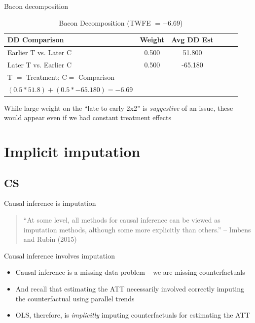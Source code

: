 \documentclass{beamer}
\begin{document}
\begin{frame}{Bacon decomposition}
\begin{table}[htbp]\centering
\small
\caption{Bacon Decomposition (TWFE $= -6.69$)}
\begin{center}
\begin{tabular}{l*{5}{c}}
\hline
\multicolumn{1}{l}{\textbf{DD Comparison}}&
\multicolumn{1}{l}{\textbf{Weight}}&
\multicolumn{1}{l}{\textbf{Avg DD Est}}\\
\hline
Earlier T vs. Later C  &     0.500   &       51.800 \\
Later T vs. Earlier C   &    0.500    &     -65.180 \\
\midrule
T $=$ Treatment; C$ =$ Comparison \\
$(0.5*51.8) + (0.5*-65.180) = -6.69$ \\
\hline
\end{tabular}
\end{center}
\end{table}

\bigskip

While large weight on the ``late to early 2x2'' is \emph{suggestive} of an issue, these would appear even if we had constant treatment effects

\end{frame}






\section{Implicit imputation}

\subsection{CS}

\begin{frame}{Causal inference is imputation}

\begin{quote}
``At some level, all methods for causal inference can be viewed as imputation methods, although some more explicitly than others.'' -- Imbens and Rubin (2015)
\end{quote}

\end{frame}


\begin{frame}{Causal inference involves imputation}

\begin{itemize}
\item Causal inference is a missing data problem -- we are missing counterfactuals
\item And recall that estimating the ATT necessarily involved correctly imputing the counterfactual using parallel trends
\item OLS, therefore, is \emph{implicitly} imputing counterfactuals for estimating the ATT
\end{itemize}

\end{frame}
\end{document}
